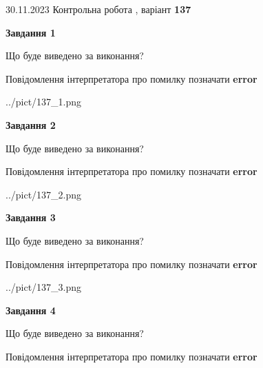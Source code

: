 \documentclass[12pt, ukrainian]{article}
\begin{document}
{{30.11.2023 Контрольна робота , варіант  \No \textbf { 137 }\par}}
{




{\begin {center}\textbf{Завдання 1}\end {center}}\par
Що буде виведено за виконання? \par
Повідомлення інтерпретатора про помилку позначати \textbf{error}

\begin{center}
	{../pict/137_1.png}
\end{center}
\newpage

{\begin {center}\textbf{Завдання 2}\end {center}}\par
Що буде виведено за виконання? \par
Повідомлення інтерпретатора про помилку позначати \textbf{error}

\begin{center}
	{../pict/137_2.png}
\end{center}
\newpage

{\begin {center}\textbf{Завдання 3}\end {center}}\par
Що буде виведено за виконання? \par
Повідомлення інтерпретатора про помилку позначати \textbf{error}

\begin{center}
	{../pict/137_3.png}
\end{center}
\newpage

{\begin {center}\textbf{Завдання 4}\end {center}}\par
Що буде виведено за виконання? \par
Повідомлення інтерпретатора про помилку позначати \textbf{error}

}
\end{document}
